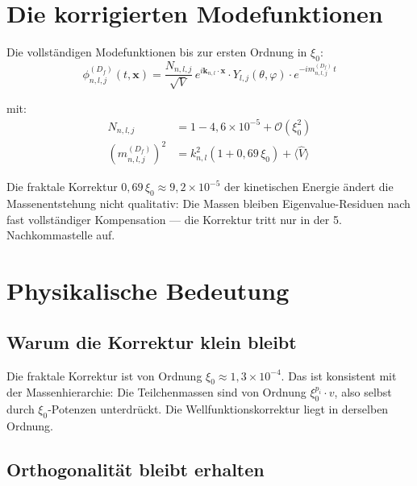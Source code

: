 \section{Die korrigierten Modefunktionen}

Die vollständigen Modefunktionen bis zur ersten Ordnung in $\xi_0$:
\begin{equation}
  \boxed{
    \phi_{n,l,j}^{(D_f)}(t,\mathbf{x})
    = \frac{N_{n,l,j}}{\sqrt{V}}\,
      e^{i\mathbf{k}_{n,l}\cdot\mathbf{x}} \cdot
      Y_{l,j}(\theta,\varphi) \cdot
      e^{-im_{n,l,j}^{(D_f)}\,t}
  }
  \label{eq:phi-korrigiert}
\end{equation}

mit:
\begin{align}
  N_{n,l,j} &= 1 - 4{,}6\times10^{-5} + \mathcal{O}(\xi_0^2)
  \label{eq:N-final} \\
  \left(m_{n,l,j}^{(D_f)}\right)^2
  &= k_{n,l}^2\left(1 + 0{,}69\,\xi_0\right) + \langle\hat{V}\rangle
  \label{eq:m-korrigiert}
\end{align}

Die fraktale Korrektur $0{,}69\,\xi_0 \approx 9{,}2 \times 10^{-5}$
der kinetischen Energie ändert die Massenentstehung nicht qualitativ:
Die Massen bleiben Eigenvalue-Residuen nach fast vollständiger
Kompensation — die Korrektur tritt nur in der 5. Nachkommastelle auf.

\section{Physikalische Bedeutung}

\subsection{Warum die Korrektur klein bleibt}

Die fraktale Korrektur ist von Ordnung $\xi_0 \approx 1{,}3\times10^{-4}$.
Das ist konsistent mit der Massenhierarchie: Die Teilchenmassen sind
von Ordnung $\xi_0^{p_i} \cdot v$, also selbst durch $\xi_0$-Potenzen
unterdrückt. Die Wellfunktionskorrektur liegt in derselben Ordnung.

\subsection{Orthogonalität bleibt erhalten}


